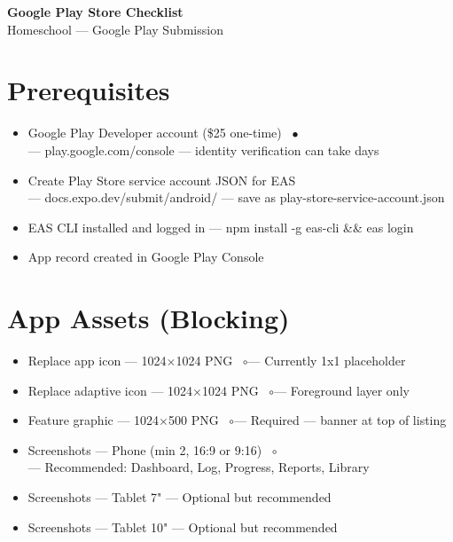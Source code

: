 \documentclass[9pt,letterpaper]{article}
\newcommand{\done}{~\hfill$\bullet$}
\newcommand{\needs}{~\hfill$\circ$}
\newcommand{\dt}[1]{{\footnotesize\color{lg}--- #1}}
\begin{document}
\newpage

\begin{center}
{\Large\bfseries Google Play Store Checklist}\\[2pt]
{\small\color{mg}Homeschool --- Google Play Submission}
\end{center}
\vspace{-0.5em}

\section*{Prerequisites}
\begin{itemize}[leftmargin=1.5em, label=$\square$, itemsep=1pt, parsep=0pt, topsep=2pt]
  \item Google Play Developer account (\$25 one-time) \done\\
    \dt{play.google.com/console --- identity verification can take days}
  \item Create Play Store service account JSON for EAS\\
    \dt{docs.expo.dev/submit/android/ --- save as play-store-service-account.json}
  \item EAS CLI installed and logged in \dt{npm install -g eas-cli \&\& eas login}
  \item App record created in Google Play Console
\end{itemize}

\section*{App Assets (Blocking)}
\begin{itemize}[leftmargin=1.5em, label=$\square$, itemsep=1pt, parsep=0pt, topsep=2pt]
  \item Replace app icon --- 1024$\times$1024 PNG \needs \dt{Currently 1x1 placeholder}
  \item Replace adaptive icon --- 1024$\times$1024 PNG \needs \dt{Foreground layer only}
  \item Feature graphic --- 1024$\times$500 PNG \needs \dt{Required --- banner at top of listing}
  \item Screenshots --- Phone (min 2, 16:9 or 9:16) \needs\\
    \dt{Recommended: Dashboard, Log, Progress, Reports, Library}
  \item Screenshots --- Tablet 7" \dt{Optional but recommended}
  \item Screenshots --- Tablet 10" \dt{Optional but recommended}
\end{itemize}
\end{document}

